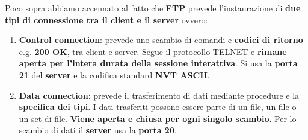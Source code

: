 \documentclass[11pt,a4paper,oneside]{book}
\theoremstyle{definition}
\begin{document}
Poco sopra abbiamo accennato al fatto che \textbf{FTP} prevede l'instaurazione di \textbf{due tipi di connessione tra il client e il server} ovvero:
\begin{enumerate}
	\item \textbf{Control connection}: prevede uno scambio di comandi e \textbf{codici di ritorno} e.g. \textbf{200 OK}, tra client e server. Segue il protocollo TELNET e \textbf{rimane aperta per l'intera durata della sessione interattiva}. Si usa la \textbf{porta 21} del \textbf{server} e la codifica standard \textbf{NVT ASCII}.
	\item \textbf{Data connection}: prevede il trasferimento di dati mediante procedure e la \textbf{specifica dei tipi}. I dati trasferiti possono essere parte di un file, un file o un set di file. \textbf{Viene aperta e chiusa per ogni singolo scambio}. Per lo scambio di dati il \textbf{server} usa la \textbf{porta 20}.
\end{enumerate}

\pagebreak
\end{document}
